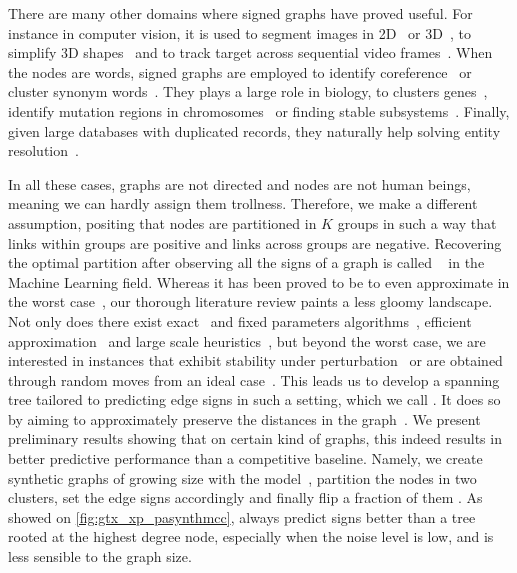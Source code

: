 There are many other domains where signed graphs have proved useful. For instance in computer
vision, it is used to segment images in 2D~\autocites{Kim2011}{Bagon2011}{CellSeg14} or
3D~\autocites{VolumeSegmentation12}{Beier2015}, to simplify 3D shapes~\autocite{Shape3D17} and to
track target across sequential video frames~\autocite{multiTracking15}. When the nodes are words,
signed graphs are employed to identify coreference~\autocites{graphicalCoreference04}{Elsner2009} or
cluster synonym words~\autocite{SignedWordRatings}. They plays a large role in biology, to clusters
genes~\autocite{Ben-Dor99}, identify mutation regions in chromosomes~\autocite{Das2015} or finding
stable subsystems~\autocite{monotoneBiology07}. Finally, given large databases with duplicated
records, they naturally help solving entity
resolution~\autocites{Crosslingual07}{DeDup09}{LargeScaleDeDup09}{WeightedER14}.

In all these cases, graphs are not directed and nodes are not human beings, meaning we can hardly
assign them trollness.  Therefore, we make a different assumption, positing that nodes are
partitioned in $K$ groups in such a way that links within groups are positive and links across
groups are negative. Recovering the optimal partition after observing all the signs of a graph is
called \pcc{}~\autocite{Bansal2002} in the Machine Learning field. Whereas it has been proved to be
\NPc{} to even approximate in the worst case~\autocites{Charikar2003}{Demaine2006}, our thorough
literature review paints a less gloomy landscape. Not only does there exist
exact~\autocite{Berg2015} and fixed parameters algorithms~\autocites{GoldenCE12}{Fomin2014},
efficient approximation~\autocites{CCPivotConf05}{ChawlaArxiv14} and large scale
heuristics~\autocites{Levorato2015}{Facchetti2011isingmodel}{Kappes2016}, but beyond the worst case,
we are interested in instances that exhibit stability under
perturbation~\autocites{clusteringFeasibility15}{StableCC09}{StableLP09} or are obtained through
random moves from an ideal case~\autocites{plantedAilon09}{Makarychev2014}. This leads us to develop
a spanning tree tailored to predicting edge signs in such a setting, which we call \gtx{}. It does
so by aiming to approximately preserve the distances in the
graph~\autocites{LowerBound95}{Abraham2012}. We present preliminary results showing that on certain
kind of graphs, this indeed results in better predictive performance than a competitive baseline.
Namely, we create synthetic graphs of growing size with the \lpa{} model~\autocite{Barabasi1999},
partition the nodes in two clusters, set the edge signs accordingly and finally flip a fraction of
them \uar{}. As showed on \autoref{fig:gtx_xp_pasynthmcc}, \gtx{} always predict signs better than a
\bfs{} tree rooted at the highest degree node, especially when the noise level is low, and is less
sensible to the graph size.

